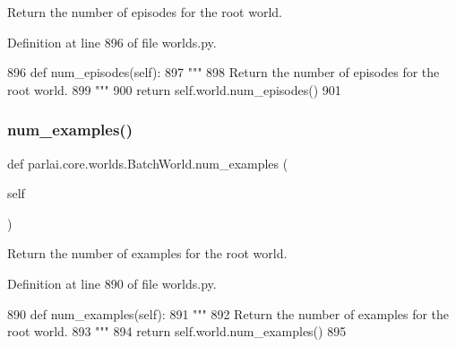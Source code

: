 \begin{DoxyVerb}Return the number of episodes for the root world.
\end{DoxyVerb}
 

Definition at line 896 of file worlds.\+py.


\begin{DoxyCode}
896     \textcolor{keyword}{def }num\_episodes(self):
897         \textcolor{stringliteral}{"""}
898 \textcolor{stringliteral}{        Return the number of episodes for the root world.}
899 \textcolor{stringliteral}{        """}
900         \textcolor{keywordflow}{return} self.world.num\_episodes()
901 
\end{DoxyCode}
\mbox{\label{classparlai_1_1core_1_1worlds_1_1BatchWorld_a047736ed3867bf7631af02f8eb0528d8}} 
\subsubsection{\texorpdfstring{num\+\_\+examples()}{num\_examples()}}
{\footnotesize\ttfamily def parlai.\+core.\+worlds.\+Batch\+World.\+num\+\_\+examples (\begin{DoxyParamCaption}\item[{}]{self }\end{DoxyParamCaption})}

\begin{DoxyVerb}Return the number of examples for the root world.
\end{DoxyVerb}
 

Definition at line 890 of file worlds.\+py.


\begin{DoxyCode}
890     \textcolor{keyword}{def }num\_examples(self):
891         \textcolor{stringliteral}{"""}
892 \textcolor{stringliteral}{        Return the number of examples for the root world.}
893 \textcolor{stringliteral}{        """}
894         \textcolor{keywordflow}{return} self.world.num\_examples()
895 
\end{DoxyCode}
\mbox{\label{classparlai_1_1core_1_1worlds_1_1BatchWorld_a297ab42faba47581774cd9333c874905}} 
